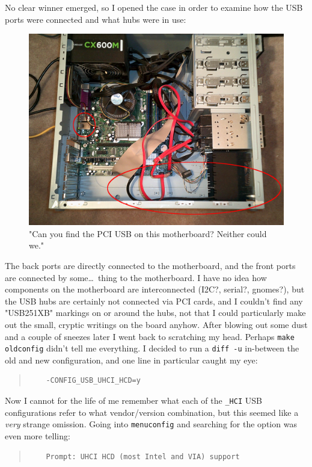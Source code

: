 \documentclass{article}
\begin{document}
No clear winner emerged, so I opened the case in order to examine how the USB ports were connected and what hubs were in use:
\begin{figure}
\includegraphics[scale=0.5]{files/blog/2018_01_08_kernel_upgrade_usb_woes/motherboard.png}
\caption{"Can you find the PCI USB on this motherboard?  Neither could we."}
\end{figure}
The back ports are directly connected to the motherboard, and the front ports are connected by some\ldots~thing to the motherboard.  I have no idea how components on the motherboard are interconnected (I2C?, serial?, gnomes?), but the USB hubs are certainly not connected via PCI cards, and I couldn't find any "USB251XB" markings on or around the hubs, not that I could particularly make out the small, cryptic writings on the board anyhow.  After blowing out some dust and a couple of sneezes later I went back to scratching my head.  Perhaps \texttt{make oldconfig} didn't tell me everything.  I decided to run a \texttt{diff -u} in-between the old and new configuration, and one line in particular caught my eye:
\begin{quote}
\begin{verbatim}
	-CONFIG_USB_UHCI_HCD=y
\end{verbatim}
\end{quote}
Now I cannot for the life of me remember what each of the \texttt{_HCI} USB configurations refer to what vendor/version combination, but this seemed like a \textit{very} strange omission.  Going into \texttt{menuconfig} and searching for the option was even more telling:
\begin{quote}
\begin{verbatim}
	Prompt: UHCI HCD (most Intel and VIA) support
\end{verbatim}
\end{quote}
\end{document}
